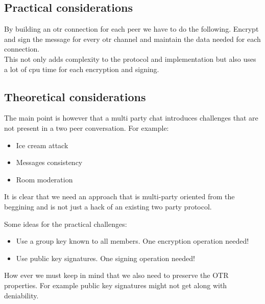 \documentclass{beamer}
\begin{document}
\subsection{Practical considerations}
\begin{frame}
By building an otr connection for each peer we have to do the following. Encrypt and sign the message for every otr channel and maintain the data needed for each connection.\\[0.5cm]

This not only adds complexity to the protocol and implementation but also uses a lot of cpu time for each encryption and signing.
\end{frame}

\subsection{Theoretical considerations}
\begin{frame}
The main point is however that a multi party chat introduces challenges that are not present in a two peer conversation. For example:

\begin{itemize}
\item Ice cream attack
\item Messages consistency 
\item Room moderation
\end{itemize}
\end{frame}

\begin{frame}
It is clear that we need an approach that is multi-party oriented from the beggining and is not just a hack of an existing two party protocol.
\end{frame}

\begin{frame}
Some ideas for the practical challenges:

\begin{itemize}
\item Use a group key known to all members. One encryption operation needed!
\item Use public key signatures. One signing operation needed!

\end{itemize}
How ever we must keep in mind that we also need to preserve the OTR properties. For example public key signatures might not get along with deniability.
\end{frame}
\end{document}
